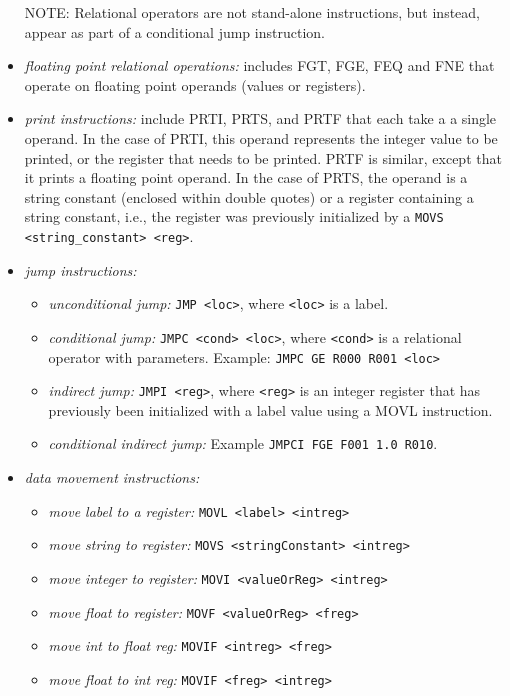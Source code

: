 \documentclass{article}
\begin{document}
\begin{itemize}
      NOTE: Relational operators are not stand-alone instructions, but 
      instead, appear as part of a conditional jump instruction.
%
\item {\em floating point relational operations:} includes FGT, FGE, FEQ and FNE 
      that operate on floating point operands (values or registers).
%
\item {\em print instructions:} include PRTI, PRTS, and PRTF that each take a 
      a single operand. In the case of PRTI, this operand represents the 
      integer value to be printed, or the register that needs to be printed. 
      PRTF is similar, except that it prints a floating point operand.
      In the case of PRTS, the operand is a string constant (enclosed within
      double quotes) or a register containing a string constant, i.e., the
      register was previously initialized by a \verb+MOVS <string_constant> <reg>+. 
%
\item {\em jump instructions:}
\begin{itemize} 
  \item {\em unconditional jump:} \verb+JMP <loc>+, where \verb+<loc>+ is a label. 
  \item {\em conditional jump:} \verb+JMPC <cond> <loc>+, where \verb+<cond>+ is a relational
         operator with parameters. Example: \verb+JMPC GE R000 R001 <loc>+
  \item {\em indirect jump:} \verb+JMPI <reg>+, where \verb+<reg>+ is an integer register that has previously been initialized with a label value using a MOVL
         instruction.
  \item {\em conditional indirect jump:} Example \verb+JMPCI FGE F001 1.0 R010+.
\end{itemize}
%
\item {\em data movement instructions: }
  \begin{itemize}
    \item {\em move label to a register:} \verb+MOVL <label> <intreg>+
    \item {\em move string to register:}  \verb+MOVS <stringConstant> <intreg>+

    \item {\em move integer to register:} \verb+MOVI <valueOrReg> <intreg>+
    \item {\em move float to register:}   \verb+MOVF <valueOrReg> <freg>+

    \item {\em move int to float reg:}    \verb+MOVIF <intreg> <freg>+
    \item {\em move float to int reg:}    \verb+MOVIF <freg> <intreg>+


\end{itemize}
\end{itemize}
\end{document}
